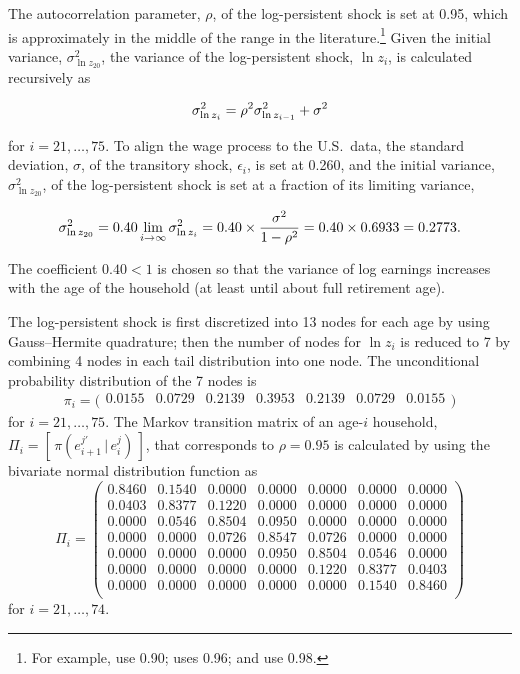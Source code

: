 \documentclass[11pt,leqno,fleqn]{article}
\newcommand{\be}{\vspace{-1em}\begin{singlespace}\begin{equation}}
\newcommand{\ee}{\end{equation}\end{singlespace}}
\begin{document}
The autocorrelation parameter, $\rho$, of the log-persistent shock is set at 0.95, which is approximately in the middle of the range in the literature.\footnote{For example, \citet{Domeij.Heathcote:2004} use 0.90; \citet{Huggett:1996} uses 0.96; and \citet{Conesa.etal:2009} use 0.98.}
Given the initial variance, $\sigma^{2}_{\ln z_{20}}$, the variance of the log-persistent shock, $\ln z_{i}$, is calculated recursively as

\be \sigma^{2}_{\ln z_{i}}=\rho^{2}\sigma^{2}_{\ln z_{i-1}}+\sigma^{2} \notag \ee

for $i=21,\ldots,75$. To align the wage process to the U.S.\ data, the standard deviation, $\sigma$, of the transitory shock, $\epsilon_{i}$, is set at 0.260, and the initial variance, $\sigma^{2}_{\ln z_{20}}$, of the log-persistent shock is set at a fraction of its limiting variance,

\be \sigma^{2}_{\ln z_{20}}=0.40\lim_{i\to\infty}\sigma^{2}_{\ln z_{i}}=0.40\times\frac{\sigma^{2}}{1-\rho^{2}}=0.40\times 0.6933=0.2773. \notag \ee

The coefficient $0.40<1$ is chosen so that the variance of log earnings increases with the age of the household (at least until about full retirement age).

The log-persistent shock is first discretized into 13 nodes for each age by using Gauss--Hermite quadrature; then the number of nodes for $\ln z_{i}$ is reduced to 7 by combining 4 nodes in each tail distribution into one node. The unconditional probability distribution of the 7 nodes is
\[
	\pi_{i}=\bigl(
	\begin{matrix}
	0.0155 & 0.0729 & 0.2139 & 0.3953 & 0.2139 & 0.0729 & 0.0155\\
	\end{matrix}
	\bigr)
\]
for $i=21,\ldots,75$. The Markov transition matrix of an age-$i$ household, $\Pi_{i}=[\,\pi(e_{i+1}^{j'}\,|\,e_{i}^{j})\,]$, that corresponds to $\rho=0.95$ is calculated by using the bivariate normal distribution function as
\begin{equation*}
	\Pi_{i}=\left(
	\begin{matrix}
	0.8460 & 0.1540 & 0.0000 & 0.0000 & 0.0000 & 0.0000 & 0.0000 \\
	0.0403 & 0.8377 & 0.1220 & 0.0000 & 0.0000 & 0.0000 & 0.0000 \\
	0.0000 & 0.0546 & 0.8504 & 0.0950 & 0.0000 & 0.0000 & 0.0000 \\
	0.0000 & 0.0000 & 0.0726 & 0.8547 & 0.0726 & 0.0000 & 0.0000 \\
	0.0000 & 0.0000 & 0.0000 & 0.0950 & 0.8504 & 0.0546 & 0.0000 \\
	0.0000 & 0.0000 & 0.0000 & 0.0000 & 0.1220 & 0.8377 & 0.0403 \\
	0.0000 & 0.0000 & 0.0000 & 0.0000 & 0.0000 & 0.1540 & 0.8460 \\
	\end{matrix}
	\right)
\end{equation*}
for $i=21,\ldots,74$.
\end{document}
